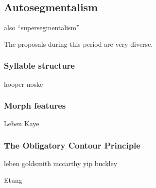 \subsection{Autosegmentalism}

also ``supersegmentalism''

The proposals during this period are very diverse. 

\subsubsection{Syllable structure}

hooper
noske

\subsubsection{Morph features}

Leben
Kaye


\subsubsection{The Obligatory Contour Principle}

leben
goldsmith
mccarthy
yip
buckley

Etung 
\citet{Goldsmith1976}

\citet{Edmondson1966}









\citet{McCarthy1979a}
\citet{Yip1988b}
